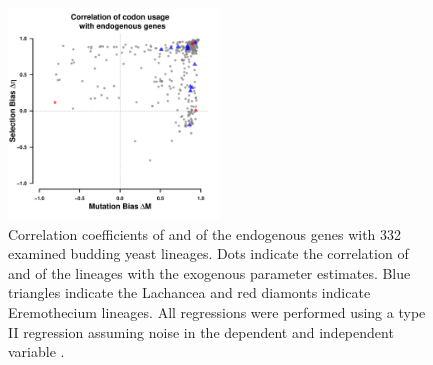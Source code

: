 \documentclass[fleqn,letterpaper]{article}
\begin{document}
\null
\vfill
\begin{figure}
     \centering
	\includegraphics[width=0.5\textwidth]{img/csp_mean_correlation_endo.pdf}
	\caption{Correlation coefficients of \DM and \DE of the endogenous genes with 332 examined budding yeast lineages. 
	Dots indicate the correlation of \DM and \DE of the lineages with the exogenous parameter estimates.
	Blue triangles indicate the Lachancea and red diamonts indicate Eremothecium lineages.
	All regressions were performed using a type II regression assuming noise in the dependent and independent variable \citep{SokalAndRohlf1981}.}
	\label{fig:csp_endo_comp}
\end{figure}
\null
\vfill
\clearpage
\end{document}
